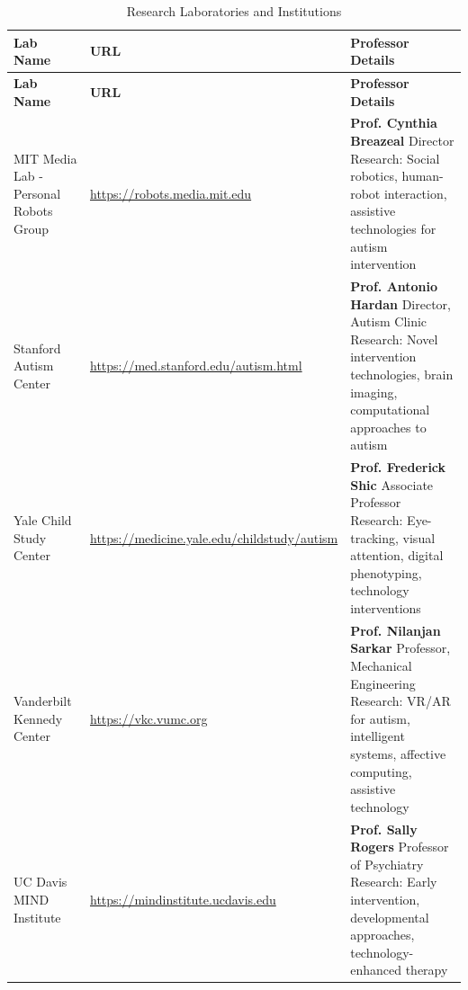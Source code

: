 \documentclass[11pt, a4paper]{article}
\begin{document}
\renewcommand{\arraystretch}{1.4}
\begin{longtable}{|>{\raggedright}p{4.5cm}|>{\raggedright}p{4cm}|>{\raggedright\arraybackslash}p{5.5cm}|}
\caption{Research Laboratories and Institutions} \\
\hline
\textbf{Lab Name} & \textbf{URL} & \textbf{Professor Details} \\
\hline
\endfirsthead
\hline
\textbf{Lab Name} & \textbf{URL} & \textbf{Professor Details} \\
\hline
\endhead
\hline
\endfoot

MIT Media Lab - Personal Robots Group & 
\url{https://robots.media.mit.edu} & 
\textbf{Prof. Cynthia Breazeal}
\newline Director
\newline Research: Social robotics, human-robot interaction, assistive technologies for autism intervention \\
\hline

Stanford Autism Center & 
\url{https://med.stanford.edu/autism.html} & 
\textbf{Prof. Antonio Hardan}
\newline Director, Autism Clinic
\newline Research: Novel intervention technologies, brain imaging, computational approaches to autism \\
\hline

Yale Child Study Center & 
\url{https://medicine.yale.edu/childstudy/autism} & 
\textbf{Prof. Frederick Shic}
\newline Associate Professor
\newline Research: Eye-tracking, visual attention, digital phenotyping, technology interventions \\
\hline

Vanderbilt Kennedy Center & 
\url{https://vkc.vumc.org} & 
\textbf{Prof. Nilanjan Sarkar}
\newline Professor, Mechanical Engineering
\newline Research: VR/AR for autism, intelligent systems, affective computing, assistive technology \\
\hline

UC Davis MIND Institute & 
\url{https://mindinstitute.ucdavis.edu} & 
\textbf{Prof. Sally Rogers}
\newline Professor of Psychiatry
\newline Research: Early intervention, developmental approaches, technology-enhanced therapy \\
\hline


\end{longtable}
\end{document}
